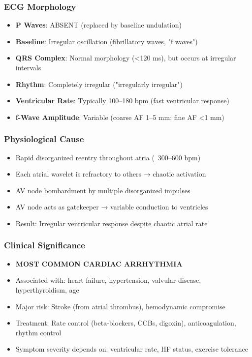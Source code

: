\documentclass[11pt, a4paper]{article}
\begin{document}
\subsubsection{ECG Morphology}
\begin{itemize}
    \item \textbf{P Waves}: ABSENT (replaced by baseline undulation)
    \item \textbf{Baseline}: Irregular oscillation (fibrillatory waves, "f waves")
    \item \textbf{QRS Complex}: Normal morphology (<120 ms), but occurs at irregular intervals
    \item \textbf{Rhythm}: Completely irregular ("irregularly irregular")
    \item \textbf{Ventricular Rate}: Typically 100--180 bpm (fast ventricular response)
    \item \textbf{f-Wave Amplitude}: Variable (coarse AF 1--5 mm; fine AF <1 mm)
\end{itemize}

\subsubsection{Physiological Cause}
\begin{itemize}
    \item Rapid disorganized reentry throughout atria (~300--600 bpm)
    \item Each atrial wavelet is refractory to others → chaotic activation
    \item AV node bombardment by multiple disorganized impulses
    \item AV node acts as gatekeeper → variable conduction to ventricles
    \item Result: Irregular ventricular response despite chaotic atrial rate
\end{itemize}

\subsubsection{Clinical Significance}
\begin{itemize}
    \item \textbf{MOST COMMON CARDIAC ARRHYTHMIA}
    \item Associated with: heart failure, hypertension, valvular disease, hyperthyroidism, age
    \item Major risk: Stroke (from atrial thrombus), hemodynamic compromise
    \item Treatment: Rate control (beta-blockers, CCBs, digoxin), anticoagulation, rhythm control
    \item Symptom severity depends on: ventricular rate, HF status, exercise tolerance
\end{itemize}
\end{document}
